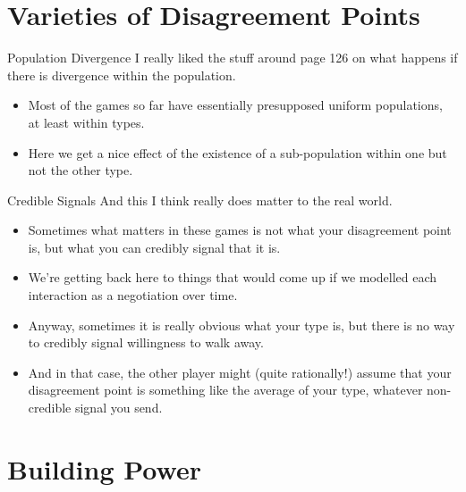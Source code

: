 \documentclass[
  ignorenonframetext,
]{beamer}
\providecommand{\tightlist}{%
  \setlength{\itemsep}{0pt}\setlength{\parskip}{0pt}}
\begin{document}
\hypertarget{varieties-of-disagreement-points}{%
\section{Varieties of Disagreement
Points}\label{varieties-of-disagreement-points}}

\begin{frame}{Population Divergence}
\protect\hypertarget{population-divergence}{}
I really liked the stuff around page 126 on what happens if there is
divergence within the population.

\begin{itemize}
\tightlist
\item
  Most of the games so far have essentially presupposed uniform
  populations, at least within types.
\item
  Here we get a nice effect of the existence of a sub-population within
  one but not the other type.
\end{itemize}
\end{frame}

\begin{frame}{Credible Signals}
\protect\hypertarget{credible-signals}{}
And this I think really does matter to the real world.

\begin{itemize}
\tightlist
\item
  Sometimes what matters in these games is not what your disagreement
  point is, but what you can credibly signal that it is.
\item
  We're getting back here to things that would come up if we modelled
  each interaction as a negotiation over time.
\item
  Anyway, sometimes it is really obvious what your type is, but there is
  no way to credibly signal willingness to walk away.
\item
  And in that case, the other player might (quite rationally!) assume
  that your disagreement point is something like the average of your
  type, whatever non-credible signal you send.
\end{itemize}
\end{frame}

\hypertarget{building-power}{%
\section{Building Power}\label{building-power}}
\end{document}
